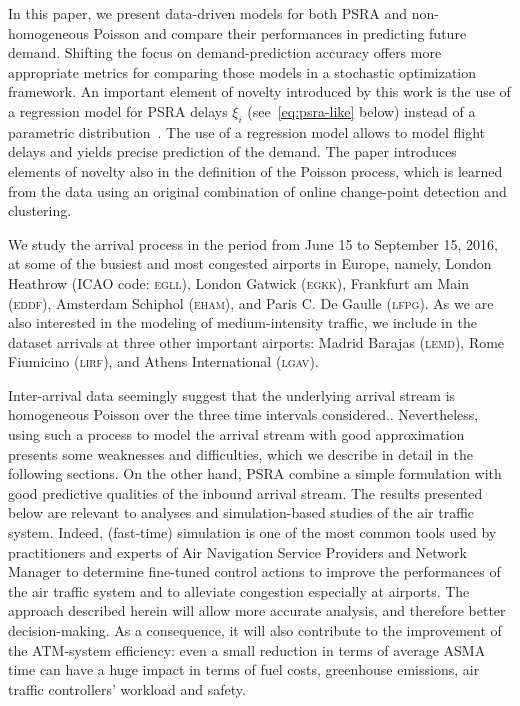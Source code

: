 \documentclass[draft,review]{elsarticle}
\newcommand{\airp}[1]{\textcolor{#1}{\textsc{#1}}}
\begin{document}
In this paper, we present data-driven models for both \ac{PSRA} and non-homogeneous Poisson and compare their performances in predicting future demand.
Shifting the focus on demand-prediction accuracy offers more appropriate metrics for comparing those models in a stochastic optimization framework.
An important element of novelty introduced by this work is the use of a regression model for \ac{PSRA} delays \(\xi_i\) (see~\eqref{eq:psra-like} below) instead of a parametric  distribution~\citep{ball1,guadagni2011queueing,nikoleris2012queueing}.
The use of a regression model allows to model flight delays and yields precise prediction of the demand.
The paper introduces elements of novelty also in the definition of the Poisson process, which is learned from the data using an original combination of online change-point detection and clustering.

We study the arrival process in the period from June 15 to September 15, 2016, at some of the busiest and most congested airports in Europe, namely, London Heathrow (\ac{ICAO} code: \airp{egll}), London Gatwick (\airp{egkk}), Frankfurt am Main (\airp{eddf}), Amsterdam Schiphol (\airp{eham}), and Paris C. De Gaulle (\airp{lfpg}).
As we are also interested in the modeling of medium-intensity traffic, we include in the dataset arrivals at three other important airports: Madrid Barajas (\airp{lemd}), Rome Fiumicino (\airp{lirf}), and Athens International (\airp{lgav}).

Inter-arrival data seemingly suggest that the underlying arrival stream is homogeneous Poisson over the three time intervals considered..
Nevertheless, using such a process to model the arrival stream with good approximation presents some weaknesses and difficulties, which we describe in detail in the following sections.
On the other hand, \ac{PSRA} combine a simple formulation with good predictive qualities of the inbound arrival stream.
The results presented below are relevant to analyses and simulation-based studies of the air traffic system.
Indeed, (fast-time) simulation is one of the most common tools used by practitioners and experts of Air Navigation Service Providers and Network Manager to determine fine-tuned control actions to improve the performances of the air traffic system and to alleviate congestion especially at airports.
The approach described herein will allow more accurate analysis, and therefore better decision-making.
As a consequence, it will also contribute to the improvement of the ATM-system efficiency: even a small reduction in terms of average ASMA time can have a huge impact in terms of fuel costs, greenhouse emissions, air traffic controllers' workload and safety.
\end{document}
